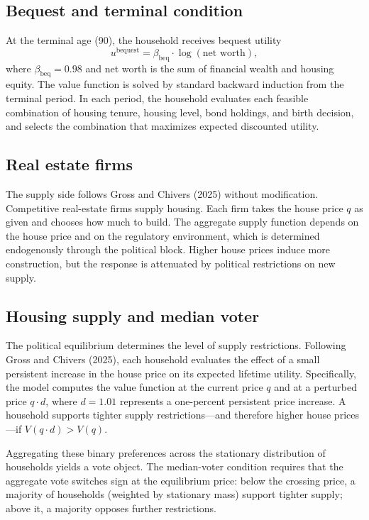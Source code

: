 \subsection{Bequest and terminal condition}

At the terminal age (90), the household receives bequest utility
\begin{equation}
u^{\text{bequest}} = \beta_{\text{beq}} \cdot \log(\text{net worth}),
\end{equation}
where $\beta_{\text{beq}} = 0.98$ and net worth is the sum of financial wealth and housing equity. The value function is solved by standard backward induction from the terminal period. In each period, the household evaluates each feasible combination of housing tenure, housing level, bond holdings, and birth decision, and selects the combination that maximizes expected discounted utility.

\subsection{Real estate firms}

The supply side follows Gross and Chivers (2025) without modification. Competitive real-estate firms supply housing. Each firm takes the house price $q$ as given and chooses how much to build. The aggregate supply function depends on the house price and on the regulatory environment, which is determined endogenously through the political block. Higher house prices induce more construction, but the response is attenuated by political restrictions on new supply.

\subsection{Housing supply and median voter}

The political equilibrium determines the level of supply restrictions. Following Gross and Chivers (2025), each household evaluates the effect of a small persistent increase in the house price on its expected lifetime utility. Specifically, the model computes the value function at the current price $q$ and at a perturbed price $q \cdot d$, where $d = 1.01$ represents a one-percent persistent price increase. A household supports tighter supply restrictions---and therefore higher house prices---if $V(q \cdot d) > V(q)$.

Aggregating these binary preferences across the stationary distribution of households yields a vote object. The median-voter condition requires that the aggregate vote switches sign at the equilibrium price: below the crossing price, a majority of households (weighted by stationary mass) support tighter supply; above it, a majority opposes further restrictions.


